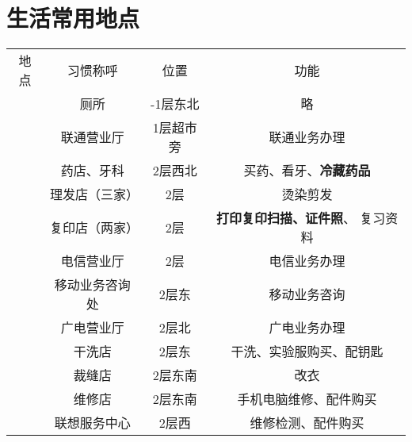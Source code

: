 \section[生活常用地点]{生活常用地点}
\label{common_locations}
\begin{table}[H]
    \centering
    \begin{tabular}{|c|c|c|c|}
        \Xhline{1.2pt}
        地点                    & 习惯称呼                  & 位置     & 功能                           \\
        \Xhline{1.2pt}
        \multirow{16}{*}{大服}  & 厕所                    & -1层东北  & 略                            \\
        \cline{2-4}
                              & 联通营业厅                 & 1层超市旁  & 联通业务办理                       \\
        \cline{2-4}
                              & 药店、牙科                 & 2层西北   & 买药、看牙、\textbf{冷藏药品}          \\
        \cline{2-4}
                              & 理发店（三家）               & 2层     & 烫染剪发                         \\
        \cline{2-4}
                              & 复印店（两家）               & 2层     & \textbf{打印复印扫描、证件照}、 复习资料    \\
        \cline{2-4}
                              & 电信营业厅                 & 2层     & 电信业务办理                       \\
        \cline{2-4}
                              & 移动业务咨询处               & 2层东    & 移动业务咨询                       \\
        \cline{2-4}
                              & 广电营业厅                 & 2层北    & 广电业务办理                       \\
        \cline{2-4}
                              & 干洗店                   & 2层东    & 干洗、实验服购买、配钥匙                 \\
        \cline{2-4}
                              & 裁缝店                   & 2层东南   & 改衣                           \\
        \cline{2-4}
                              & 维修店                   & 2层东南   & 手机电脑维修、配件购买                  \\
        \cline{2-4}
                              & 联想服务中心                & 2层西    & 维修检测、配件购买                    \\
        \cline{2-4}

\end{tabular}
\end{table}
